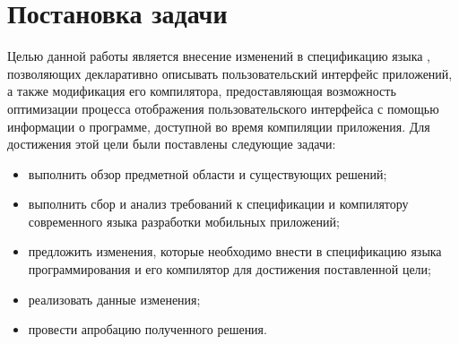 \section{Постановка задачи}
Целью данной работы является внесение изменений в спецификацию языка
, позволяющих декларативно описывать пользовательский интерфейс
приложений, а также модификация его компилятора, предоставляющая возможность
оптимизации процесса отображения пользовательского интерфейса с помощью
информации о программе, доступной во время компиляции приложения.
Для достижения этой цели были поставлены следующие задачи:
\begin{itemize}
	\item выполнить обзор предметной области и существующих решений;
	\item выполнить сбор и анализ требований к спецификации и компилятору
	современного языка разработки мобильных приложений;
	\item предложить изменения, которые необходимо внести в спецификацию языка
	программирования  и его компилятор для достижения
	поставленной цели;
	\item реализовать данные изменения;
	\item провести апробацию полученного решения.
\end{itemize}